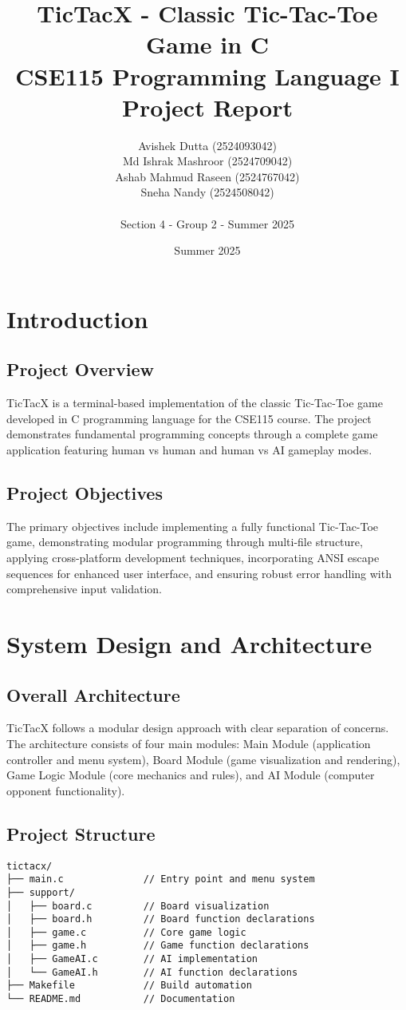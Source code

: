 \documentclass[12pt]{article}
\title{\textbf{TicTacX - Classic Tic-Tac-Toe Game in C}\\
\large CSE115 Programming Language I Project Report}
\author{
    Avishek Dutta (2524093042) \\
    Md Ishrak Mashroor (2524709042) \\
    Ashab Mahmud Raseen (2524767042) \\
    Sneha Nandy (2524508042) \\
    \\
    \small Section 4 - Group 2 - Summer 2025
}
\date{Summer 2025}
\begin{document}
\maketitle
\thispagestyle{fancy}

\section{Introduction}

\subsection{Project Overview}
TicTacX is a terminal-based implementation of the classic Tic-Tac-Toe game developed in C programming language for the CSE115 course. The project demonstrates fundamental programming concepts through a complete game application featuring human vs human and human vs AI gameplay modes.

\subsection{Project Objectives}
The primary objectives include implementing a fully functional Tic-Tac-Toe game, demonstrating modular programming through multi-file structure, applying cross-platform development techniques, incorporating ANSI escape sequences for enhanced user interface, and ensuring robust error handling with comprehensive input validation.

\section{System Design and Architecture}

\subsection{Overall Architecture}
TicTacX follows a modular design approach with clear separation of concerns. The architecture consists of four main modules: Main Module (application controller and menu system), Board Module (game visualization and rendering), Game Logic Module (core mechanics and rules), and AI Module (computer opponent functionality).

\subsection{Project Structure}
\begin{lstlisting}[caption=Project Directory Structure]
tictacx/
├── main.c              // Entry point and menu system
├── support/
│   ├── board.c         // Board visualization
│   ├── board.h         // Board function declarations
│   ├── game.c          // Core game logic
│   ├── game.h          // Game function declarations
│   ├── GameAI.c        // AI implementation
│   └── GameAI.h        // AI function declarations
├── Makefile            // Build automation
└── README.md           // Documentation
\end{lstlisting}
\end{document}
